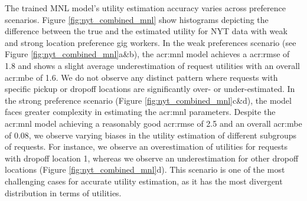 The trained MNL model’s utility estimation accuracy varies across preference scenarios. Figure \ref{fig:nyt_combined_mnl} show histograms depicting the difference between the true and the estimated utility for NYT data with weak and strong location preference gig workers. In the weak preferences scenario (see Figure \ref{fig:nyt_combined_mnl}a\&b), the \gls{acr:mnl} model achieves a \gls{acr:rmse} of 1.8 and shows a slight average underestimation of request utilities with an overall \gls{acr:mbe} of 1.6. We do not observe any distinct pattern where requests with specific pickup or dropoff locations are significantly over- or under-estimated. In the strong preference scenario (Figure \ref{fig:nyt_combined_mnl}c\&d), the model faces greater complexity in estimating the \gls{acr:mnl} parameters. Despite the \gls{acr:mnl} model achieving a reasonably good \gls{acr:rmse} of 2.5 and an overall \gls{acr:mbe} of 0.08, we observe varying biases in the utility estimation of different subgroups of requests. For instance, we observe an overestimation of utilities for requests with dropoff location 1, whereas we observe an underestimation for other dropoff locations (Figure \ref{fig:nyt_combined_mnl}d). This scenario is one of the most challenging cases for accurate utility estimation, as it has the most divergent distribution in terms of utilities.

